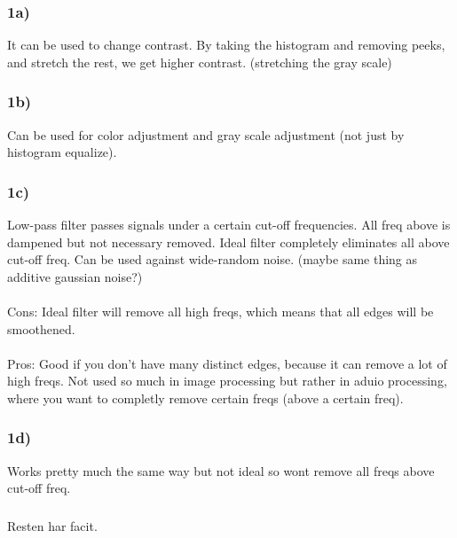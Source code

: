 \documentclass[12pt]{article}
\begin{document}
    \subsubsection*{1a)}
    
        It can be used to change contrast. By taking the histogram and removing peeks, and stretch the rest, we get higher contrast.
        (stretching the gray scale)
    
     \subsubsection*{1b)}
     
        Can be used for color adjustment and gray scale adjustment (not just by histogram equalize).
        
    \subsubsection*{1c)}
    
        Low-pass filter passes signals under a certain cut-off frequencies. All freq above is dampened but not necessary removed. 
        Ideal filter completely eliminates all above cut-off freq. Can be used against wide-random noise. (maybe same thing as additive
        gaussian noise?)\\
        \\
        Cons: Ideal filter will remove all high freqs, which means that all edges will be smoothened.\\
        \\
        Pros: Good if you don't have many distinct edges, because it can remove a lot of high freqs. 
        Not used so much in image processing but rather in aduio processing, where you want to completly 
        remove certain freqs (above a certain freq).
        
    \subsubsection*{1d)}
    
        Works pretty much the same way but not ideal so wont remove all freqs above cut-off freq.
        
    \subsubsection*{}
    
        Resten har facit.
        
\end{document}
